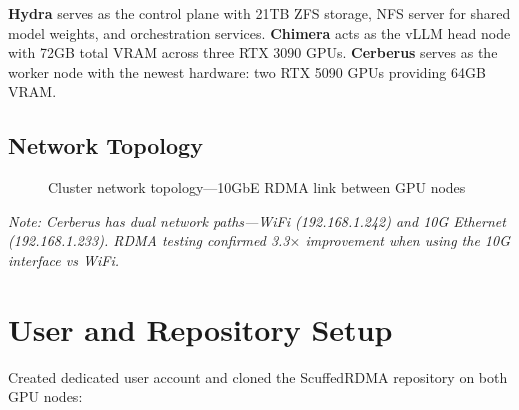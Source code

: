 \documentclass[10pt,letterpaper]{article}
\begin{document}
\textbf{Hydra} serves as the control plane with 21TB ZFS storage, NFS server for shared model weights, and orchestration services. \textbf{Chimera} acts as the vLLM head node with 72GB total VRAM across three RTX 3090 GPUs. \textbf{Cerberus} serves as the worker node with the newest hardware: two RTX 5090 GPUs providing 64GB VRAM.

\subsection{Network Topology}

\begin{figure}[H]
\centering
{}
\caption{Cluster network topology---10GbE RDMA link between GPU nodes}
\end{figure}

\textit{Note: Cerberus has dual network paths---WiFi (192.168.1.242) and 10G Ethernet (192.168.1.233). RDMA testing confirmed 3.3$\times$ improvement when using the 10G interface vs WiFi.}

\section{User and Repository Setup}

Created dedicated user account and cloned the ScuffedRDMA repository on both GPU nodes:
\end{document}
